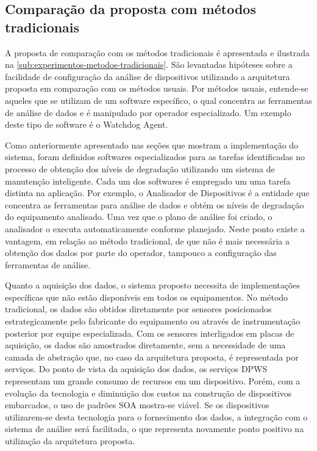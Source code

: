 \subsection{Comparação da proposta com métodos tradicionais}


A proposta de comparação com os métodos tradicionais é apresentada e ilustrada na
\cref{sub:experimentos-metodos-tradicionais}. São levantadas hipóteses sobre a facilidade de
configuração da análise de dispositivos utilizando a arquitetura proposta em comparação com os
métodos usuais. Por métodos usuais, entende-se aqueles que se utilizam de um software específico, o
qual concentra as ferramentas de análise de dados e é manipulado por operador especializado. Um
exemplo deste tipo de software é o Watchdog Agent.

Como anteriormente apresentado nas seções que mostram a implementação do sistema, foram definidos
softwares especializados para as tarefas identificadas no processo de obtenção dos níveis de
degradação utilizando um sistema de manutenção inteligente. Cada um dos softwares é empregado um uma
tarefa distinta na aplicação. Por exemplo, o Analisador de Dispositivos é a entidade que concentra
as ferramentas para análise de dados e obtém os níveis de degradação do equipamento analisado. Uma
vez que o plano de análise foi criado, o analisador o executa automaticamente conforme planejado.
Neste ponto existe a vantagem, em relação ao método tradicional, de que não é mais necessária a
obtenção dos dados por parte do operador, tampouco a configuração das ferramentas de análise.

Quanto a aquisição dos dados, o sistema proposto necessita de implementações específicas que não
estão disponíveis em todos os equipamentos. No método tradicional, os dados são obtidos diretamente
por sensores posicionados estrategicamente pelo fabricante do equipamento ou através de
instrumentação posterior por equipe especializada. Com os sensores interligados em placas de
aquisição, os dados são amostrados diretamente, sem a necessidade de uma camada de abstração que, no
caso da arquitetura proposta, é representada por serviços. Do ponto de vista da aquisição dos dados,
os serviços \gls{DPWS} representam um grande consumo de recursos em um dispositivo. Porém, com a
evolução da tecnologia e diminuição dos custos na construção de dispositivos embarcados, o uso de
padrões \gls{SOA} mostra-se viável. Se os dispositivos utilizarem-se desta tecnologia para o
fornecimento dos dados, a integração com o sistema de análise será facilitada, o que representa
novamente ponto positivo na utilização da arquitetura proposta.


